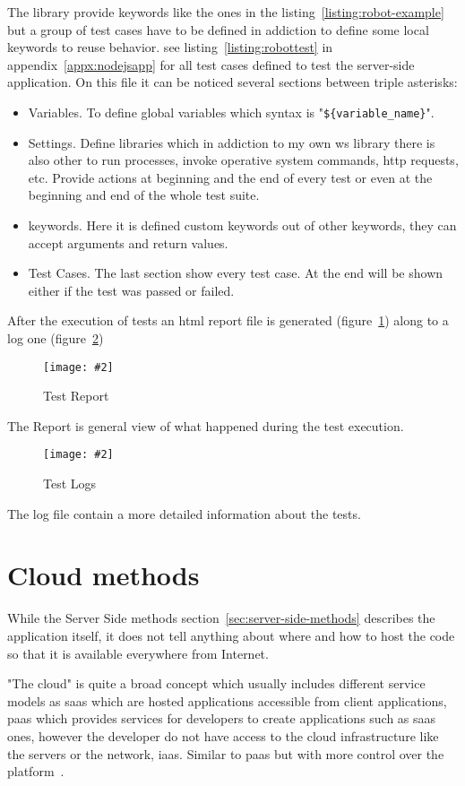 \documentclass[hidelinks,11pt,a4paper,oneside,article]{memoir}
\newcommand{\putimage}[3][10] %
{
\begin{figure}[h]
	\centering
	\captionsetup{justification=centering}
	\texttt{[image: \#2]}
	\caption{#3}
	\label{fig:#2}
\end{figure}
}
\begin{document}
The library provide keywords like the ones in the listing~\ref{listing:robot-example} but a group of test cases have to be defined in addiction to define some local keywords to reuse behavior. see listing~\ref{listing:robottest} in appendix~\ref{appx:nodejsapp} for all test cases defined to test the server-side application. On this file it can be noticed several sections between triple asterisks:
\begin{itemize}
    \item Variables. To define global variables which syntax is "\texttt{\$\{variable\_name\}}".
    \item Settings. Define libraries which in addiction to my own \gls{ws} library there is also other to run processes, invoke operative system commands, \gls{http} requests, etc. Provide actions at beginning and the end of every test or even at the beginning and end of the whole test suite.
    \item keywords. Here it is defined custom keywords out of other keywords, they can accept arguments and return values.
    \item Test Cases. The last section show every test case. At the end will be shown either if the test was passed or failed.
\end{itemize}

After the execution of tests an \gls{html} report file is generated (figure~\ref{fig:test-report}) along to a log one (figure~\ref{fig:test-log})

    \putimage[14]{test-report}{Test Report}
     
The Report is general view of what happened during the test execution.
     
    \putimage[14]{test-log}{Test Logs}
    
The log file contain a more detailed information about the tests.



\section{Cloud methods}
While the Server Side methods section~\ref{sec:server-side-methods} describes the application itself, it does not tell anything about where and how to host the code so that it is available everywhere from Internet.

"The cloud" is quite a broad concept which usually includes different service models as \gls{saas} which are hosted applications accessible from client applications, \gls{paas} which provides services for developers to create applications such as \gls{saas} ones, however the developer do not have access to the cloud infrastructure like the servers or the network, \gls{iaas}. Similar to \gls{paas} but with more control over the platform~\cite{petermelltimothygrance2011}.
\end{document}

